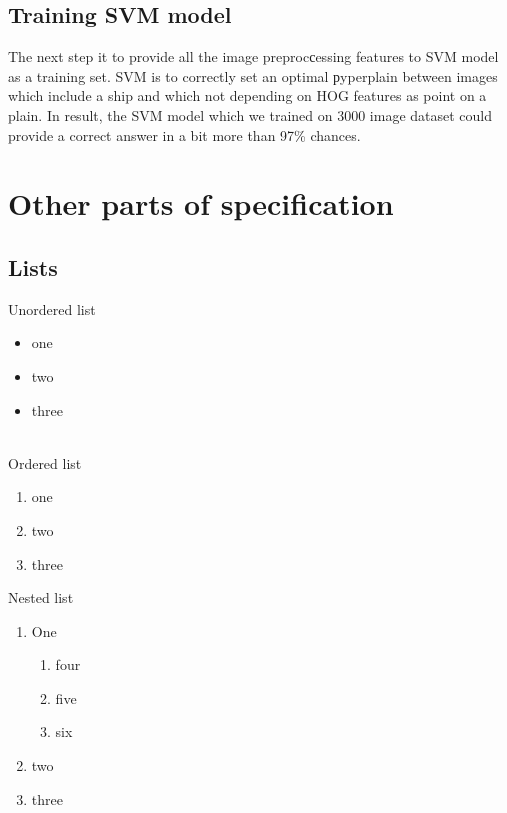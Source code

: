 \documentclass[10pt,a4paper]{report}
\begin{document}
\section{Training SVM model}
The next step it to provide  all the image preprocсessing features to SVM model as a training set. SVM is to correctly set an optimal рyperplain between images which include a ship and which not depending on HOG features as point on a plain. In result, the SVM model which we trained on 3000 image dataset could provide a correct answer in a bit more than 97\% chances.
\clearpage
\chapter{Other parts of specification}
\section{Lists}
Unordered list
\begin{itemize}
    \item one
    \item two
    \item three
\end{itemize} \\
Ordered list
\begin{enumerate}
    \item one
    \item two
    \item three
\end{enumerate}
Nested list
\begin{enumerate}
    \item One
    \begin{enumerate}
        \item four
        \item five
        \item six
    \end{enumerate}
    \item two
    \item three
    \end{enumerate}
\end{document}
